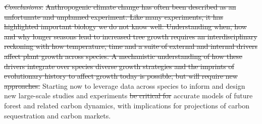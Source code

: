 \documentclass[11pt]{article}
\providecommand{\DIFaddtex}[1]{{\protect\color{blue}\uwave{#1}}} %
\providecommand{\DIFdeltex}[1]{{\protect\color{red}\sout{#1}}}                      %
\providecommand{\DIFaddbegin}{} %
\providecommand{\DIFaddend}{} %
\providecommand{\DIFdelbegin}{} %
\providecommand{\DIFdelend}{} %
\providecommand{\DIFadd}[1]{\texorpdfstring{\DIFaddtex{#1}}{#1}} %
\providecommand{\DIFdel}[1]{\texorpdfstring{\DIFdeltex{#1}}{}} %
\newcommand{\DIFscaledelfig}{0.5}
\newlength{\DIFdelgraphicswidth} %
\newlength{\DIFdelgraphicsheight} %
\newcommand{\DIFaddincludegraphics}[2][]{{\color{blue}\fbox{\DIFOincludegraphics[#1]{#2}}}} %
\newcommand{\DIFdelincludegraphics}[2][]{%
\sbox{\DIFdelgraphicsbox}{\DIFOincludegraphics[#1]{#2}}%
\settoboxwidth{\DIFdelgraphicswidth}{\DIFdelgraphicsbox} %
\settoboxtotalheight{\DIFdelgraphicsheight}{\DIFdelgraphicsbox} %
\scalebox{\DIFscaledelfig}{%
\parbox[b]{\DIFdelgraphicswidth}{\usebox{\DIFdelgraphicsbox}\\[-\baselineskip] \rule{\DIFdelgraphicswidth}{0em}}\llap{\resizebox{\DIFdelgraphicswidth}{\DIFdelgraphicsheight}{%
\setlength{\unitlength}{\DIFdelgraphicswidth}%
\begin{picture}(1,1)%
\thicklines\linethickness{2pt} %
{\color[rgb]{1,0,0}\put(0,0){\framebox(1,1){}}}%
{\color[rgb]{1,0,0}\put(0,0){\line( 1,1){1}}}%
{\color[rgb]{1,0,0}\put(0,1){\line(1,-1){1}}}%
\end{picture}%
}\hspace*{3pt}}} %
} %
\DeclareRobustCommand{\DIFaddbegin}{\DIFOaddbegin \let\includegraphics\DIFaddincludegraphics} %
\DeclareRobustCommand{\DIFaddend}{\DIFOaddend \let\includegraphics\DIFOincludegraphics} %
\DeclareRobustCommand{\DIFdelbegin}{\DIFOdelbegin \let\includegraphics\DIFdelincludegraphics} %
\DeclareRobustCommand{\DIFdelend}{\DIFOaddend \let\includegraphics\DIFOincludegraphics} %
\begin{document}
\emph{\DIFdel{Conclusions:}} 
\DIFdel{Anthropogenic climate change has often been described as an unfortunate and unplanned experiment. Like many experiments, it has highlighted important biology we do not know well. Understanding when, how and why longer seasons lead to increased tree growth requires an interdisciplinary reckoning with how temperature, time and a suite of external and internal drivers affect plant growth across species. A mechanistic understanding of how these drivers integrate over species diverse growth strategies and the imprints of evolutionary history to affect growth today is possible, but will require new approaches.  }\DIFdelend Starting now to leverage data across species to inform and design new large-scale studies and experiments \DIFdelbegin \DIFdel{be critical for }\DIFdelend \DIFaddbegin \DIFadd{will help build }\DIFaddend accurate models of future forest and related carbon dynamics, with implications for projections of carbon sequestration and carbon markets.

 \DIFaddbegin 

\DIFaddend %


\end{document}
